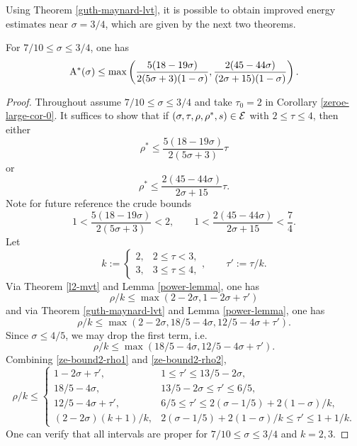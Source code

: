 Using Theorem \ref{guth-maynard-lvt}, it is possible to obtain improved energy estimates near $\sigma = 3/4$, which are given by the next two theorems.

\begin{theorem}\label{imp-energy-bound2}
For $7/10 \le \sigma \le 3/4$, one has
\[
\mathrm{A}^*(\sigma) \le \max\left(\frac{5(18 - 19\sigma)}{2(5\sigma + 3)(1 - \sigma)}, \frac{2(45 - 44\sigma)}{(2\sigma + 15)(1
- \sigma)}\right).
\]
\end{theorem}

\derived
{}

\begin{proof}

Throughout assume $7/10 \le \sigma \le 3/4$ and take $\tau_0 = 2$ in Corollary \ref{zeroe-large-cor-0}. It suffices to show that if $(\sigma, \tau, \rho, \rho^*, s) \in \mathcal{E}$ with $2 \le \tau \le 4$, then either
\begin{equation}
\rho^* \le \frac{5(18 - 19\sigma)}{2(5\sigma + 3)}\tau
\end{equation}
or
\begin{equation}
\rho^* \le \frac{2(45 - 44\sigma)}{2\sigma + 15}\tau.
\end{equation}
Note for future reference the crude bounds
\begin{equation}\label{ze-bound2-tau-factor-bounds}
1 < \frac{5(18 - 19\sigma)}{2(5\sigma + 3)} < 2,\qquad 1 < \frac{2(45 - 44\sigma)}{2\sigma + 15} < \frac{7}{4}.
\end{equation}
Let
\[
k := \begin{cases}
2,& 2 \le \tau < 3,\\
3,& 3 \le \tau \le 4,
\end{cases},\qquad \tau' := \tau/k.
\]
Via Theorem \ref{l2-mvt} and Lemma \ref{power-lemma}, one has
\begin{equation}\label{ze-bound2-rho1}
\rho/k \le \max(2 - 2\sigma, 1 - 2\sigma + \tau')
\end{equation}
and via Theorem \ref{guth-maynard-lvt} and Lemma \ref{power-lemma}, one has
\[
\rho/k\le \max(2 - 2\sigma, 18/5 - 4\sigma, 12/5 - 4\sigma + \tau').
\]
Since $\sigma \le 4/5$, we may drop the first term, i.e.
\begin{equation}\label{ze-bound2-rho2}
\rho/k \le \max(18/5 - 4\sigma, 12/5 - 4\sigma + \tau').
\end{equation}
Combining \eqref{ze-bound2-rho1} and \eqref{ze-bound2-rho2},
\begin{equation}\label{ze-bound2-rhok-bound}
\rho/k \le \begin{cases}
1 - 2\sigma + \tau',&1 \le \tau' \le 13/5 - 2\sigma,\\
18/5 - 4\sigma,& 13/5 - 2\sigma \le \tau' \le 6/5,\\
12/5 - 4\sigma + \tau',& 6/5 \le \tau' \le 2(\sigma - 1/5) + 2(1 - \sigma)/k,\\
(2 - 2\sigma)(k + 1)/k,& 2(\sigma - 1/5) + 2(1 - \sigma)/k \le \tau' \le 1 + 1/k.
\end{cases}
\end{equation}
One can verify that all intervals are proper for $7/10 \le \sigma \le 3/4$ and $k = 2,3$.


\end{proof}
